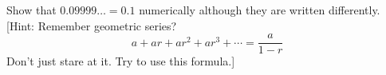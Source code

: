 Show that $0.09999\ldots = 0.1$ numerically although they are
written differently. [Hint: Remember geometric series?
\[ a + ar + ar^2 + ar^3 + \cdots = \frac{a}{1-r} \]
Don't just stare at it. Try to use this formula.]
